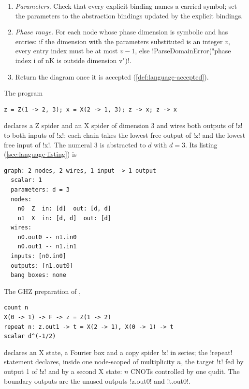 \begin{algorithm}
\begin{enumerate}
\item \emph{Parameters.} Check that every explicit binding names a carried symbol; set the parameters to the abstraction bindings updated by the explicit bindings.
\item \emph{Phase range.} For each node whose phase dimension is symbolic and has entries: if the dimension with the parameters substituted is an integer $v$, every entry index must be at most $v-1$, else \code!ParseDomainError("phase index i of nK is outside dimension v")!.
\item Return the diagram once it is accepted (\cref{def:language-accepted}).
\end{enumerate}
\end{algorithm}

\begin{example}\label{ex:language-dsl}
The program
\begin{lstlisting}[style=azx]
z = Z(1 -> 2, 3); x = X(2 -> 1, 3); z -> x; z -> x
\end{lstlisting}
declares a Z spider and an X spider of dimension $3$ and wires both outputs of \code!z! to both inputs of \code!x!: each chain takes the lowest free output of \code!z! and the lowest free input of \code!x!. The numeral $3$ is abstracted to $d$ with $d=3$. Its listing (\cref{sec:language-listing}) is
\begin{lstlisting}[style=grammar]
graph: 2 nodes, 2 wires, 1 input -> 1 output
  scalar: 1
  parameters: d = 3
  nodes:
    n0  Z  in: [d]  out: [d, d]
    n1  X  in: [d, d]  out: [d]
  wires:
    n0.out0 -- n1.in0
    n0.out1 -- n1.in1
  inputs: [n0.in0]
  outputs: [n1.out0]
  bang boxes: none
\end{lstlisting}
\end{example}

\begin{example}\label{ex:language-dsl-family}
The GHZ preparation of ,
\begin{lstlisting}[style=azx]
count n
X(0 -> 1) -> F -> z = Z(1 -> 2)
repeat n: z.out1 -> t = X(2 -> 1), X(0 -> 1) -> t
scalar d^(-1/2)
\end{lstlisting}
declares an X state, a Fourier box and a copy spider \code!z! in series; the \code!repeat! statement declares, inside one node-scoped \bbox{} of multiplicity $n$, the target \code!t! fed by output 1 of \code!z! and by a second X state: $n$ CNOTs controlled by one qudit. The boundary outputs are the unused outputs \code!z.out0! and \code!t.out0!.
\end{example}

